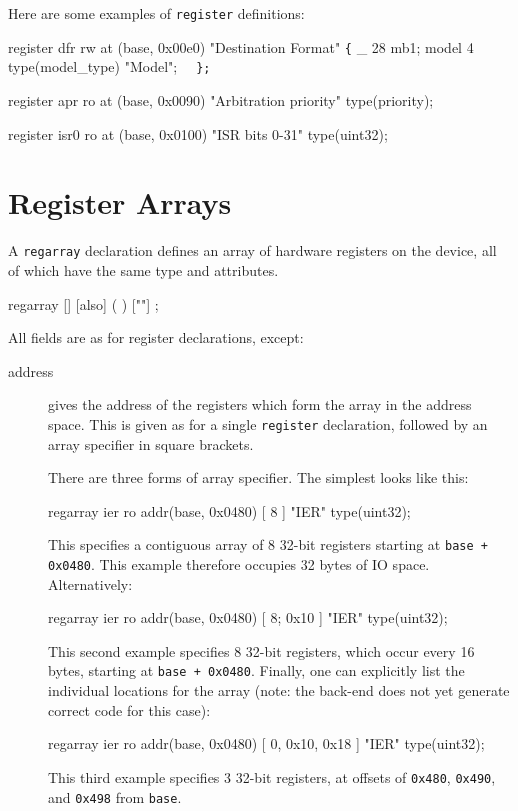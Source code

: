 \documentclass[a4paper,11pt,twoside]{report}
\begin{document}
Here are some examples of \texttt{register} definitions:

\begin{example}
  register dfr rw at (base, 0x00e0) 
              "Destination Format" \verb+{+
    _		28 mb1;
    model	4 type(model_type) "Model";
\verb+  };+
\end{example}
\begin{example}
  register apr ro at (base, 0x0090) 
              "Arbitration priority" type(priority);
\end{example}
\begin{example}
  register isr0 ro at (base, 0x0100) 
              "ISR bits 0-31" type(uint32);
\end{example}

\section{Register Arrays}\label{sec:regarrays}

A \texttt{regarray} declaration defines an array of hardware registers
on the device, all of which have the same type and attributes. 

\begin{syntax}
regarray  [] [also] 
             (  ) [""]  ;
\end{syntax}

All fields are as for register declarations, except: 

\begin{description}

\item[address] gives the address of the registers which form the array
  in the address space.  This is given as for a single
  \texttt{register} declaration, followed by an array specifier in
  square brackets.  

  There are three forms of array specifier. The simplest looks like
  this:
  \begin{example}
    regarray ier ro addr(base, 0x0480) [ 8 ] 
                 "IER" type(uint32);
  \end{example}
  This specifies a contiguous array of 8 32-bit registers starting at
  \texttt{base + 0x0480}.  This example therefore occupies 32 bytes of
  IO space.  Alternatively: 
  \begin{example}
    regarray ier ro addr(base, 0x0480) [ 8; 0x10 ] 
                 "IER" type(uint32);
  \end{example}
  This second example specifies 8 32-bit registers, which occur every 16 bytes,
  starting at \texttt{base + 0x0480}.  Finally, one can explicitly
  list the individual locations for the array (note: the back-end does
  not yet generate correct code for this case):
  \begin{example}
    regarray ier ro addr(base, 0x0480) [ 0, 0x10, 0x18 ] 
                 "IER" type(uint32);
  \end{example}
  This third example specifies 3 32-bit registers, at offsets of
  \texttt{0x480}, \texttt{0x490}, and \texttt{0x498} from
  \texttt{base}. 

\end{description}
\end{document}
